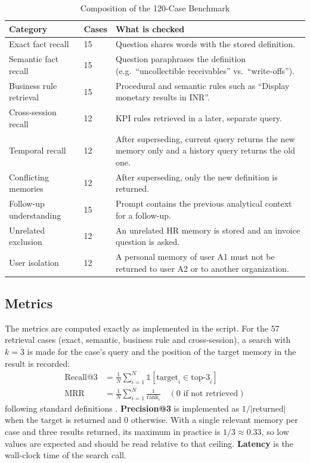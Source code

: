 \begin{table}[H]
    \centering
    \small
    \caption{Composition of the 120-Case Benchmark}
    \begin{tabular}{p{4.6cm} p{0.9cm} p{7.9cm}}
        \toprule
        \textbf{Category} & \textbf{Cases} & \textbf{What is checked} \\
        \midrule
        Exact fact recall        & 15 & Question shares words with the stored definition. \\[3pt]
        Semantic fact recall     & 15 & Question paraphrases the definition (e.g.\ ``uncollectible receivables'' vs.\ ``write-offs''). \\[3pt]
        Business rule retrieval  & 15 & Procedural and semantic rules such as ``Display monetary results in INR''. \\[3pt]
        Cross-session recall     & 12 & KPI rules retrieved in a later, separate query. \\[3pt]
        Temporal recall          & 12 & After superseding, current query returns the new memory only and a history query returns the old one. \\[3pt]
        Conflicting memories     & 12 & After superseding, only the new definition is returned. \\[3pt]
        Follow-up understanding  & 15 & Prompt contains the previous analytical context for a follow-up. \\[3pt]
        Unrelated exclusion      & 12 & An unrelated HR memory is stored and an invoice question is asked. \\[3pt]
        User isolation           & 12 & A personal memory of user A1 must not be returned to user A2 or to another organization. \\
        \bottomrule
    \end{tabular}
    \label{tab:dataset}
\end{table}

\subsection{Metrics}
The metrics are computed exactly as implemented in the script. For the 57 retrieval cases
(exact, semantic, business rule and cross-session), a search with $k=3$ is made for the
case's query and the position of the target memory in the result is recorded:
\begin{align}
    \text{Recall@3} &= \frac{1}{N}\sum_{i=1}^{N} \mathbb{1}[\text{target}_i \in \text{top-3}_i] \\
    \text{MRR} &= \frac{1}{N}\sum_{i=1}^{N} \frac{1}{\text{rank}_i} \quad (0 \text{ if not retrieved})
\end{align}
following standard definitions \cite{manning2008ir, voorhees1999trec}.
\textbf{Precision@3} is implemented as $1/|\text{returned}|$ when the target is returned and
0 otherwise. With a single relevant memory per case and three results returned, its maximum
in practice is $1/3 \approx 0.33$, so low values are expected and should be read relative to
that ceiling. \textbf{Latency} is the wall-clock time of the search call.


